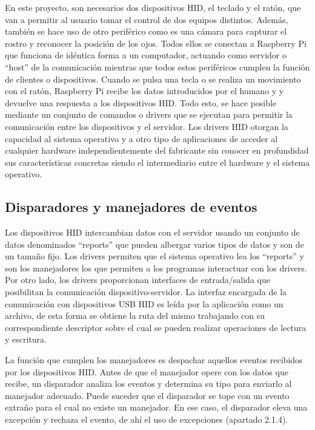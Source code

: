 En este proyecto, son necesarios dos dispositivos HID, el teclado y el ratón, que van a permitir al usuario tomar el control de dos equipos distintos. Además, también se hace uso de otro periférico como es una cámara para capturar el rostro y reconocer la posición de los ojos. Todos ellos se conectan a Raspberry Pi que funciona de idéntica forma a un computador, actuando como servidor o ``host'' de la comunicación mientras que todos estos periféricos cumplen la función de clientes o dispositivos. Cuando se pulsa una tecla o se realiza un movimiento con el ratón, Raspberry Pi recibe los datos introducidos por el humano y y devuelve una respuesta a los dispositivos HID. Todo esto, se hace posible mediante un conjunto de comandos o drivers que se ejecutan para permitir la comunicación entre los dispositivos y el servidor. Los drivers HID otorgan la capacidad al sistema operativo y a otro tipo de aplicaciones de acceder al cualquier hardware independientemente del fabricante sin conocer en profundidad sus características concretas siendo el intermediario entre el hardware y el sistema operativo.



\subsection{Disparadores y manejadores de eventos} \label{s2_1_2}

Los dispositivos HID intercambian datos con el servidor usando un conjunto de datos denominados ``reports'' que pueden albergar varios tipos de datos y son de un tamaño fijo. Los drivers permiten que el sistema operativo lea los ``reports'' y son los manejadores los que permiten a los programas interactuar con los drivers. Por otro lado, los drivers proporcionan interfaces de entrada/salida que posibilitan la comunicación dispositivo-servidor. La interfaz encargada de la comunicación con dispositivos USB HID es leída por la aplicación como un archivo, de esta forma se obtiene la ruta del mismo trabajando con su correspondiente descriptor sobre el cual se pueden realizar operaciones de lectura y escritura. 

La función que cumplen los manejadores es despachar aquellos eventos recibidos por los dispositivos HID. Antes de que el manejador opere con los datos que recibe, un disparador analiza los eventos y determina su tipo para enviarlo al manejador adecuado. Puede suceder que el disparador se tope con un evento extraño para el cual no existe un manejador. En ese caso, el disparador eleva una excepción y rechaza el evento, de ahí el uso de excepciones (apartado 2.1.4).

